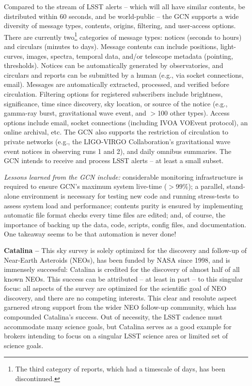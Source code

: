 Compared to the stream of LSST alerts -- which will all have similar contents, be distributed within 60 seconds, and be world-public -- the GCN supports a wide diversity of message types, contents, origins, filtering, and user-access options. There are currently two\footnote{The third category of reports, which had a timescale of days, has been discontinued.} categories of message types: notices (seconds to hours) and circulars (minutes to days). Message contents can include positions, light-curves, images, spectra, temporal data, and/or telescope metadata (pointing, thresholds). Notices can be automatically generated by observatories, and circulars and reports can be submitted by a human (e.g., via socket connections, email). Messages are automatically extracted, processed, and verified before circulation. Filtering options for registered subscribers include brightness, significance, time since discovery, sky location, or source of the notice (e.g., gamma-ray burst, gravitational wave event, and $>$100 other types). Access options include email, socket connections (including IVOA VOEvent protocol), an online archival, etc. The GCN also supports the restriction of circulation to private networks (e.g., the LIGO-VIRGO Collaboration's gravitational wave event notices in observing runs 1 and 2), and daily omnibus summaries. The GCN intends to receive and process LSST alerts -- at least a small subset. 

{\it Lessons learned from the GCN include:} considerable monitoring infrastructure is required to ensure GCN's maximum system live-time ($>$99\%); a parallel, stand-alone environment is necessary for testing new code and running stress-tests to assess system load and performance; contents purity is ensured by implementing automatic file format checks every time files are edited; and, of course, the importance of backing up the data, code, scripts, config files, and documentation. One takeaway seems to be that automation is never done!

{\bf Catalina --} This sky survey is solely optimized for the discovery and follow-up of Near-Earth Asteroids (NEOs), has been funded by NASA since 1998, and is immensely successful: Catalina is credited for the discovery of almost half of all known NEOs. This success can be attributed -- at least in part -- to this singular focus: all aspects of the survey are optimized for the scientific goal of NEO discovery, and there are no competing interests. This clear and resolute aspect garnered strong support from the wider NEO follow-up community, which has compounded Catalina's success. Out of necessity, the LSST cadence must accommodate many science goals, but Catalina serves as a good example for brokers intending to focus on a singular LSST science area or limited set of science goals. 

